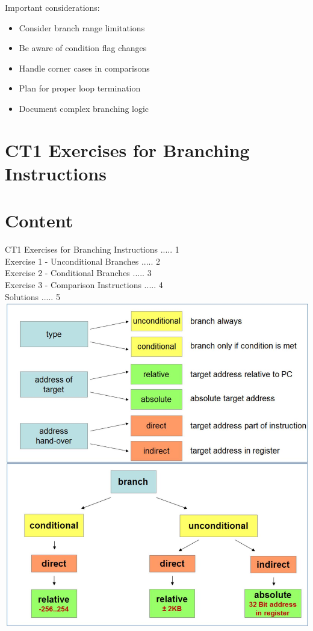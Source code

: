 \begin{remark}
Important considerations:
\begin{itemize}
  \item Consider branch range limitations
  \item Be aware of condition flag changes
  \item Handle corner cases in comparisons
  \item Plan for proper loop termination
  \item Document complex branching logic
\end{itemize}
\end{remark}

\section*{CT1 Exercises for Branching Instructions}
\section*{Content}
CT1 Exercises for Branching Instructions ..... 1\\
Exercise 1 - Unconditional Branches ..... 2\\
Exercise 2 - Conditional Branches ..... 3\\
Exercise 3 - Comparison Instructions ..... 4\\
Solutions ..... 5\\
\includegraphics[width=\linewidth]{images/2025_01_02_9902c2d2685de638ef73g-1}

